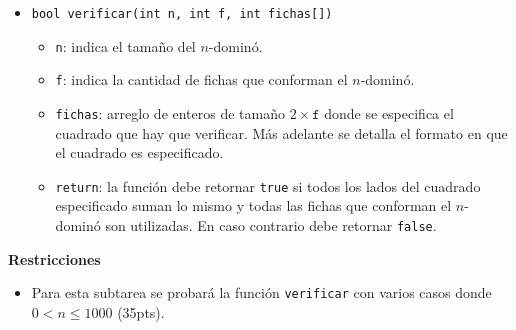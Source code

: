 \documentclass{oci}
\begin{document}
\begin{itemize}
 \item \verb+bool verificar(int n, int f, int fichas[])+
 \begin{itemize}
  \item \verb+n+: indica el tamaño del $n$-dominó.
  \item \verb+f+: indica la cantidad de fichas que conforman el $n$-dominó.
  \item \verb+fichas+: arreglo de enteros de tamaño $2\times\texttt{f}$ donde se especifica el cuadrado que hay que verificar. Más adelante se detalla el formato en que el cuadrado es especificado.
  \item \verb+return+: la función debe retornar \verb+true+ si todos los lados del cuadrado especificado suman lo mismo y todas las fichas que conforman el $n$-dominó son utilizadas. 
   En caso contrario debe retornar \verb+false+.
 \end{itemize}
\end{itemize}

{\bf Restricciones}
\vspace{-.6em}
\begin{itemize}
\item Para esta subtarea se probará la función \verb+verificar+ con varios casos donde $0 < n\leq 1000$ (35pts).
\end{itemize}
\end{document}
